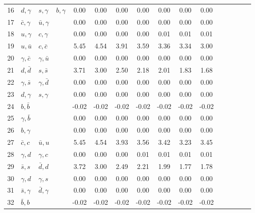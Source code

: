\begin{tabularx}{\textwidth}{rXXX@{}S@{}S@{}S@{}S@{}S@{}S@{}S@{}S@{}S@{}S@{}S@{}S}
  16 & $d,\gamma$      & $s,\gamma$      & $b,\gamma$      &  0.00 &  0.00 &  0.00 &  0.00 &  0.00 &  0.00 &  0.00 \\
  17 & $\bar c,\gamma$ & $\bar u,\gamma$ &                 &  0.00 &  0.00 &  0.00 &  0.00 &  0.00 &  0.00 &  0.00 \\
  18 & $u,\gamma$      & $c,\gamma$      &                 &  0.00 &  0.00 &  0.00 &  0.00 &  0.01 &  0.01 &  0.01 \\
  19 & $u,\bar u$      & $c,\bar c$      &                 &  5.45 &  4.54 &  3.91 &  3.59 &  3.36 &  3.34 &  3.00 \\
  20 & $\gamma,\bar c$ & $\gamma,\bar u$ &                 &  0.00 &  0.00 &  0.00 &  0.00 &  0.00 &  0.00 &  0.00 \\
  21 & $d,\bar d$      & $s,\bar s$      &                 &  3.71 &  3.00 &  2.50 &  2.18 &  2.01 &  1.83 &  1.68 \\
  22 & $\gamma,\bar s$ & $\gamma,\bar d$ &                 &  0.00 &  0.00 &  0.00 &  0.00 &  0.00 &  0.00 &  0.00 \\
  23 & $d,\gamma$      & $s,\gamma$      &                 &  0.00 &  0.00 &  0.00 &  0.00 &  0.00 &  0.00 &  0.00 \\
  24 & $b,\bar b$      &                 &                 & -0.02 & -0.02 & -0.02 & -0.02 & -0.02 & -0.02 & -0.02 \\
  25 & $\gamma,\bar b$ &                 &                 &  0.00 &  0.00 &  0.00 &  0.00 &  0.00 &  0.00 &  0.00 \\
  26 & $b,\gamma$      &                 &                 &  0.00 &  0.00 &  0.00 &  0.00 &  0.00 &  0.00 &  0.00 \\
  27 & $\bar c,c$      & $\bar u, u$     &                 &  5.45 &  4.54 &  3.93 &  3.56 &  3.42 &  3.23 &  3.45 \\
  28 & $\gamma, d$     & $\gamma, c$     &                 &  0.00 &  0.00 &  0.00 &  0.01 &  0.01 &  0.01 &  0.01 \\
  29 & $\bar s,s$      & $\bar d, d$     &                 &  3.72 &  3.00 &  2.49 &  2.21 &  1.99 &  1.77 &  1.78 \\
  30 & $\gamma,d$      & $\gamma, s$     &                 &  0.00 &  0.00 &  0.00 &  0.00 &  0.00 &  0.00 &  0.00 \\
  31 & $\bar s,\gamma$ & $\bar d,\gamma$ &                 &  0.00 &  0.00 &  0.00 &  0.00 &  0.00 &  0.00 &  0.00 \\
  32 & $\bar b,b$      &                 &                 & -0.02 & -0.02 & -0.02 & -0.02 & -0.02 & -0.02 & -0.02 \\

\end{tabularx}
